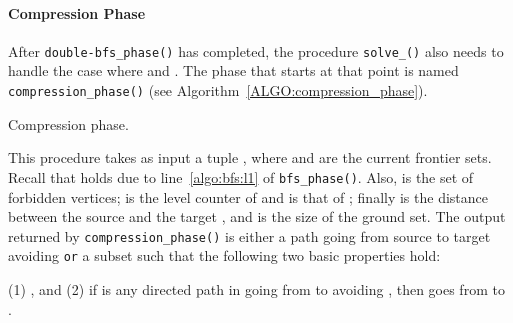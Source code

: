 \paragraph{Compression Phase}
After \texttt{double-bfs\_phase()} has completed,
the procedure \texttt{solve\_\mainproblem()} also needs to handle
the case
where  and .
The phase that starts at that point is named \texttt{compression\_phase()}
(see Algorithm~\ref{ALGO:compression_phase}).
\begin{algorithm}[t]
\caption{Compression phase.}\label{ALGO:compression_phase}
\nonl{}
\DontPrintSemicolon
\footnotesize
{}
\end{algorithm}
This procedure takes as input a tuple
,
where  and  are the current frontier sets.
Recall that  holds due to line~\ref{algo:bfs:l1} of \texttt{bfs\_phase()}.
Also,  is the set of forbidden vertices;
 is the level counter of  and  is that
of ; finally  is the distance between the source  and the target , and  is the size of the ground set.
The output returned by \texttt{compression\_phase()} is either a path  going from source  to target 
avoiding  \texttt{or} a subset  such that the following two basic properties hold:


(1) , and
(2) if  is any directed path in  going from
 to  avoiding , then  goes from  to .


